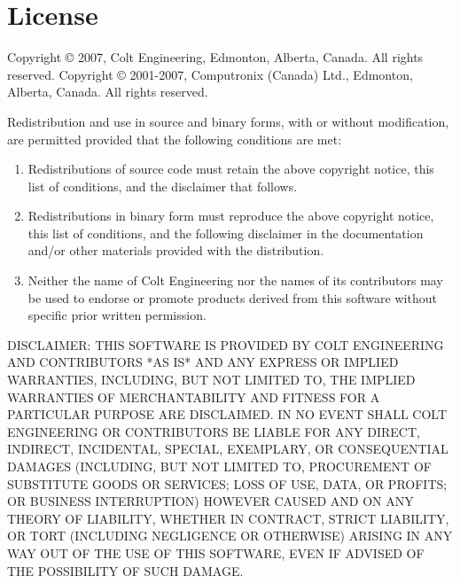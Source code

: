 \chapter{License}

\centerline{}

Copyright \copyright{} 2007, Colt Engineering, Edmonton, Alberta, Canada.
All rights reserved.\break
Copyright \copyright{} 2001-2007, Computronix (Canada) Ltd., Edmonton, Alberta, Canada.
All rights reserved.

Redistribution and use in source and binary forms, with or without
modification, are permitted provided that the following conditions are met:

\begin{enumerate}
\item
    Redistributions of source code must retain the above copyright notice,
    this list of conditions, and the disclaimer that follows.

\item
    Redistributions in binary form must reproduce the above copyright
    notice, this list of conditions, and the following disclaimer in the
    documentation and/or other materials provided with the distribution.

\item
    Neither the name of Colt Engineering nor the names of its contributors may
    be used to endorse or promote products derived from this software
    without specific prior written permission.
\end{enumerate}

DISCLAIMER:
THIS SOFTWARE IS PROVIDED BY COLT ENGINEERING AND CONTRIBUTORS *AS IS*
AND ANY EXPRESS OR IMPLIED WARRANTIES, INCLUDING, BUT NOT LIMITED TO,
THE IMPLIED WARRANTIES OF MERCHANTABILITY AND FITNESS FOR A
PARTICULAR PURPOSE ARE DISCLAIMED. IN NO EVENT SHALL COLT ENGINEERING
OR CONTRIBUTORS BE LIABLE FOR ANY DIRECT, INDIRECT, INCIDENTAL,
SPECIAL, EXEMPLARY, OR CONSEQUENTIAL DAMAGES (INCLUDING, BUT NOT
LIMITED TO, PROCUREMENT OF SUBSTITUTE GOODS OR SERVICES; LOSS OF
USE, DATA, OR PROFITS; OR BUSINESS INTERRUPTION) HOWEVER CAUSED
AND ON ANY THEORY OF LIABILITY, WHETHER IN CONTRACT, STRICT LIABILITY,
OR TORT (INCLUDING NEGLIGENCE OR OTHERWISE) ARISING IN ANY WAY OUT
OF THE USE OF THIS SOFTWARE, EVEN IF ADVISED OF THE POSSIBILITY OF
SUCH DAMAGE.

